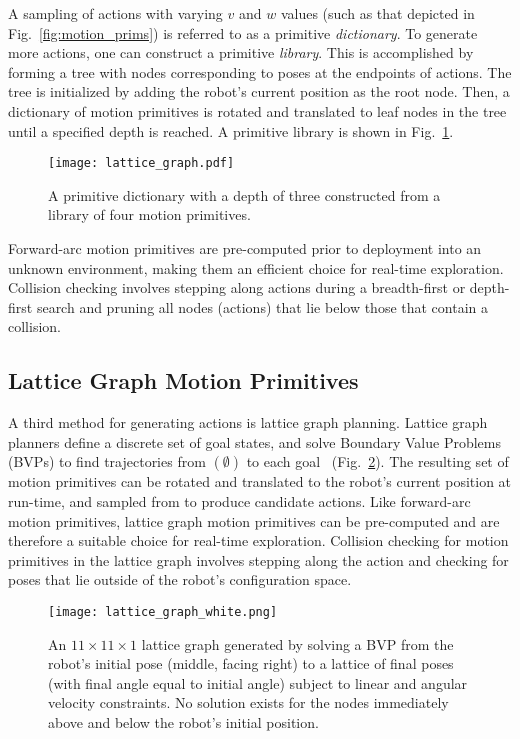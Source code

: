 A sampling of actions with varying $v$ and $w$ values (such as that depicted in
Fig.~\ref{fig:motion_prims}) is referred to as a
primitive \textit{dictionary}. To generate more actions, one can construct a
primitive \textit{library}. This is accomplished by forming a tree with nodes
corresponding to poses at the endpoints of actions. The tree is initialized by adding
the robot's current position as the root node. Then, a dictionary of motion
primitives is rotated and translated to leaf nodes in the tree until a specified
depth is reached. A primitive library is shown in
Fig.~\ref{fig:primitive_library}.
%
\begin{figure}
  \centering
  \texttt{[image: lattice\_graph.pdf]}
  \caption{A primitive dictionary with a depth of three constructed from a
  library of four motion primitives. \label{fig:primitive_library}}
\end{figure}

Forward-arc motion primitives are pre-computed prior to deployment into an
unknown environment, making them an efficient choice for real-time exploration. Collision
checking involves stepping along actions during a breadth-first or depth-first search and
pruning all nodes (actions) that lie below those that contain a collision.

\subsection{Lattice Graph Motion Primitives}
\label{subsec:lg_motion_primitives}

A third method for generating actions is lattice graph planning. Lattice graph
planners define a discrete set of goal states, and
solve Boundary Value Problems (BVPs) to find trajectories from $(\emptyset)$ to
each goal~\cite{pivtoraiko2005generating,pivtoraiko2009differentially,pivtoraiko2013incremental}
(Fig.~\ref{fig:lattice_graph}). The resulting set of motion primitives can
be rotated and translated to the robot's current position at run-time, and sampled
from to produce candidate actions. Like forward-arc motion primitives, lattice
graph motion primitives can be pre-computed and are therefore a suitable choice for
real-time exploration. Collision checking for motion primitives in the lattice
graph involves stepping along the action and checking for poses that lie outside
of the robot's configuration space.

\begin{figure}
  \centering
  \texttt{[image: lattice\_graph\_white.png]}
  \caption{An $11\times 11 \times 1$ lattice graph generated by solving a BVP
  from the robot's initial pose (middle, facing right) to a lattice of final
poses (with final angle equal to initial angle) subject to linear and angular velocity
constraints. No solution exists for the nodes immediately above and below the
robot's initial position. \label{fig:lattice_graph}}
\end{figure}

